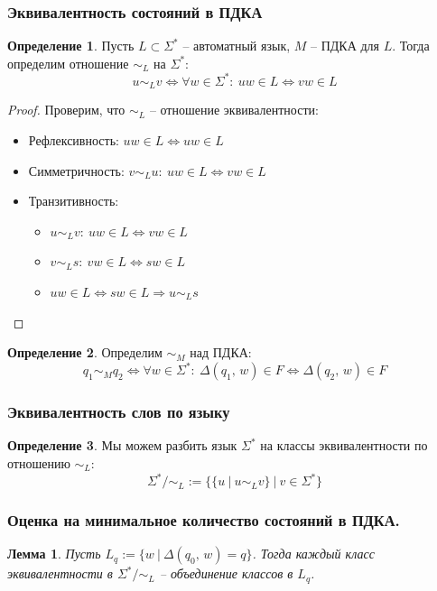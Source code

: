 \documentclass[a4paper,12pt]{article}
\theoremstyle{plain}
\newtheorem{lemma}{Лемма}[subsection]
\theoremstyle{definition}
\newtheorem{definition}{Определение}[subsection]
\theoremstyle{remark}
\begin{document}
\subsubsection*{Эквивалентность состояний в ПДКА}
\begin{definition}
	Пусть $L \subset \Sigma^*$ -- автоматный язык, $M$ -- ПДКА для $L$. Тогда определим отношение $\sim_L$ на $\Sigma^*$:
	\[
		u \sim_L v \Leftrightarrow \forall w \in \Sigma^* :\: uw \in L \Leftrightarrow vw \in L
	\]
\end{definition}

\begin{proof}
	Проверим, что $\sim_L$ -- отношение эквивалентности:
	\begin{itemize}
		\item Рефлексивность: $uw \in L \Leftrightarrow uw \in L$
		\item Симметричность: $v \sim_L u:\: uw \in L \Leftrightarrow vw \in L$
		\item Транзитивность:
		      \begin{itemize}
			      \item $u \sim_L v :\: uw \in L \Leftrightarrow vw \in L$
			      \item $v \sim_L s :\: vw \in L \Leftrightarrow sw \in L$
			      \item $uw \in L \Leftrightarrow sw \in L \Rightarrow u \sim_L s$
		      \end{itemize}
	\end{itemize}
\end{proof}

\begin{definition}
	Определим $\sim_M$ над ПДКА:
	\[
		q_1 \sim_M q_2 \Leftrightarrow \forall w \in \Sigma^* :\: \Delta(q_1,\, w) \in F \Leftrightarrow \Delta(q_2,\, w) \in F
	\]
\end{definition}

\subsubsection*{Эквивалентность слов по языку}
\begin{definition}
	Мы можем разбить язык $\Sigma^*$ на классы эквивалентности по отношению $\sim_L$:
	\[
		\Sigma^* / \sim_L := \{\{u \:|\: u \sim_L v\} \:|\: v \in \Sigma^*\}
	\]
\end{definition}

\subsubsection*{Оценка на минимальное количество состояний в ПДКА.}
\begin{lemma}
	Пусть $L_q := \{w \:|\: \Delta(q_0,\, w) = q\}$. Тогда каждый класс эквивалентности в $\Sigma^* / \sim_L$ -- объединение классов в $L_q$.
\end{lemma}
\end{document}
